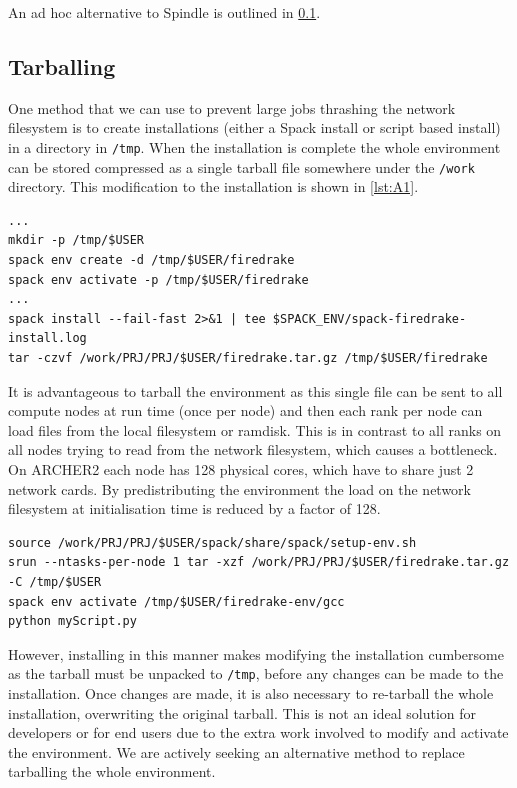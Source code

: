 \documentclass[a4paper,11pt]{article}
\begin{document}
An ad hoc alternative to Spindle is outlined in \cref{ssec:tarball}.


\subsection{Tarballing}
\label{ssec:tarball}
One method that we can use to prevent large jobs thrashing the network filesystem is to create installations (either a Spack install or script based install) in a directory in \verb`/tmp`.
When the installation is complete the whole environment can be stored compressed as a single tarball file somewhere under the \verb`/work` directory.
This modification to the installation is shown in \cref{lst:A1}.

\begin{lstlisting}[caption={Modified steps in Spack installation, showing installation under \texttt{/tmp} and tarballing the installation at the end (other steps elided)},label={lst:A1}]
...
mkdir -p /tmp/$USER
spack env create -d /tmp/$USER/firedrake
spack env activate -p /tmp/$USER/firedrake
...
spack install --fail-fast 2>&1 | tee $SPACK_ENV/spack-firedrake-install.log
tar -czvf /work/PRJ/PRJ/$USER/firedrake.tar.gz /tmp/$USER/firedrake
\end{lstlisting}

It is advantageous to tarball the environment as this single file can be sent to all compute nodes at run time (once per node) and then each rank per node can load files from the local filesystem or ramdisk.
This is in contrast to all ranks on all nodes trying to read from the network filesystem, which causes a bottleneck.
On ARCHER2 each node has 128 physical cores, which have to share just 2 network cards.
By predistributing the environment the load on the network filesystem at initialisation time is reduced by a factor of 128.

\begin{lstlisting}[caption={Modified steps in running script under Spack, untarballing the installation before activating the environment},label={lst:A2}]
source /work/PRJ/PRJ/$USER/spack/share/spack/setup-env.sh
srun --ntasks-per-node 1 tar -xzf /work/PRJ/PRJ/$USER/firedrake.tar.gz -C /tmp/$USER
spack env activate /tmp/$USER/firedrake-env/gcc
python myScript.py
\end{lstlisting}

However, installing in this manner makes modifying the installation cumbersome as the tarball must be unpacked to \verb`/tmp`, before any changes can be made to the installation.
Once changes are made, it is also necessary to re-tarball the whole installation, overwriting the original tarball.
This is not an ideal solution for developers or for end users due to the extra work involved to modify and activate the environment.
We are actively seeking an alternative method to replace tarballing the whole environment.




\end{document}
